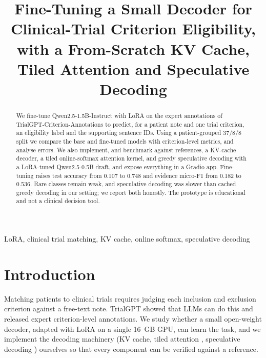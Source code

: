 \documentclass[conference]{IEEEtran}
\begin{document}
\title{Fine-Tuning a Small Decoder for Clinical-Trial Criterion Eligibility, with a From-Scratch KV Cache, Tiled Attention and Speculative Decoding}
\author{
}
\maketitle

\begin{abstract}
We fine-tune Qwen2.5-1.5B-Instruct with LoRA on the expert annotations of TrialGPT-Criterion-Annotations to predict, for a patient note and one trial criterion, an eligibility label and the supporting sentence IDs. Using a patient-grouped 37/8/8 split we compare the base and fine-tuned models with criterion-level metrics, and analyse errors. We also implement, and benchmark against references, a KV-cache decoder, a tiled online-softmax attention kernel, and greedy speculative decoding with a LoRA-tuned Qwen2.5-0.5B draft, and expose everything in a Gradio app. Fine-tuning raises test accuracy from 0.107 to 0.748 and evidence micro-F1 from 0.182 to 0.536. Rare classes remain weak, and speculative decoding was slower than cached greedy decoding in our setting; we report both honestly. The prototype is educational and not a clinical decision tool.
\end{abstract}

\begin{IEEEkeywords}
LoRA, clinical trial matching, KV cache, online softmax, speculative decoding
\end{IEEEkeywords}

\section{Introduction}
Matching patients to clinical trials requires judging each inclusion and exclusion criterion against a free-text note. TrialGPT \cite{trialgpt} showed that LLMs can do this and released expert criterion-level annotations. We study whether a small open-weight decoder, adapted with LoRA \cite{lora} on a single 16~GB GPU, can learn the task, and we implement the decoding machinery (KV cache, tiled attention \cite{flash,milakov}, speculative decoding \cite{leviathan,chen}) ourselves so that every component can be verified against a reference.
\end{document}
